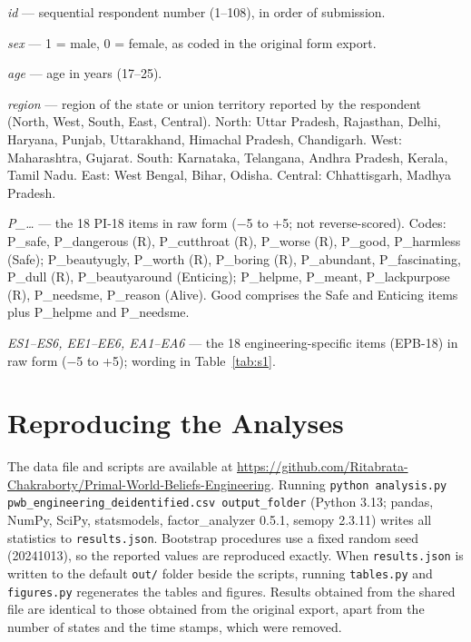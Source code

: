 \documentclass[journal,a4paper]{IEEEtran}
\begin{document}
\emph{id} — sequential respondent number (1–108), in order of submission.

\emph{sex} — 1 = male, 0 = female, as coded in the original form export.

\emph{age} — age in years (17–25).

\emph{region} — region of the state or union territory reported by the respondent (North, West, South, East, Central). North: Uttar Pradesh, Rajasthan, Delhi, Haryana, Punjab, Uttarakhand, Himachal Pradesh, Chandigarh. West: Maharashtra, Gujarat. South: Karnataka, Telangana, Andhra Pradesh, Kerala, Tamil Nadu. East: West Bengal, Bihar, Odisha. Central: Chhattisgarh, Madhya Pradesh.

\emph{P\_\ldots{}} — the 18 PI-18 items in raw form ($-$5 to +5; not reverse-scored). Codes: P\_safe, P\_dangerous (R), P\_cutthroat (R), P\_worse (R), P\_good, P\_harmless (Safe); P\_beautyugly, P\_worth (R), P\_boring (R), P\_abundant, P\_fascinating, P\_dull (R), P\_beautyaround (Enticing); P\_helpme, P\_meant, P\_lackpurpose (R), P\_needsme, P\_reason (Alive). Good comprises the Safe and Enticing items plus P\_helpme and P\_needsme.

\emph{ES1–ES6, EE1–EE6, EA1–EA6} — the 18 engineering-specific items (EPB-18) in raw form ($-$5 to +5); wording in Table~\ref{tab:s1}.

\section{Reproducing the Analyses}\label{sec:s4}

The data file and scripts are available at \url{https://github.com/Ritabrata-Chakraborty/Primal-World-Beliefs-Engineering}. Running \texttt{python analysis.py pwb\_engineering\_deidentified.csv output\_folder} (Python 3.13; pandas, NumPy, SciPy, statsmodels, factor\_analyzer 0.5.1, semopy 2.3.11) writes all statistics to \texttt{results.json}. Bootstrap procedures use a fixed random seed (20241013), so the reported values are reproduced exactly. When \texttt{results.json} is written to the default \texttt{out/} folder beside the scripts, running \texttt{tables.py} and \texttt{figures.py} regenerates the tables and figures. Results obtained from the shared file are identical to those obtained from the original export, apart from the number of states and the time stamps, which were removed.
\end{document}
